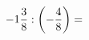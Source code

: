 \documentclass[preview]{standalone}
\begin{document}
\begin{align*}
-1 { 3 \over 8 }  :  \left( - { 4 \over 8 } \right)  =
\end{align*}
\end{document}
